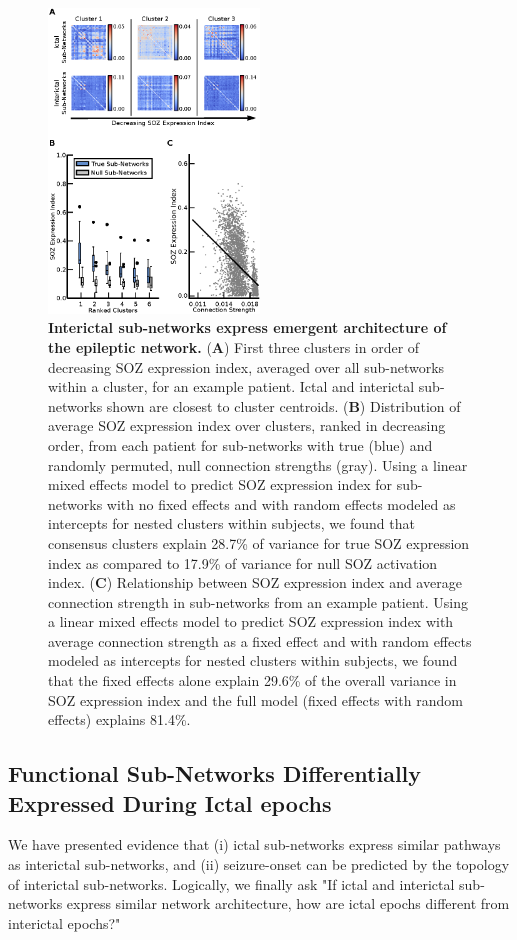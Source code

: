 \begin{figure}[H]
    \centering
    \includegraphics[width=0.5\textwidth]{panel4.eps}
    \caption[Interictal sub-networks predict epileptic network architecture]{\textbf{Interictal sub-networks express emergent architecture of the epileptic network.} (\textbf{A}) First three clusters in order of decreasing SOZ expression index, averaged over all sub-networks within a cluster, for an example patient. Ictal and interictal sub-networks shown are closest to cluster centroids. (\textbf{B}) Distribution of average SOZ expression index over clusters, ranked in decreasing order, from each patient for sub-networks with true (blue) and randomly permuted, null connection strengths (gray). Using a linear mixed effects model to predict SOZ expression index for sub-networks with no fixed effects and with random effects modeled as intercepts for nested clusters within subjects, we found that consensus clusters explain 28.7\% of variance for true SOZ expression index as compared to 17.9\% of variance for null SOZ activation index. (\textbf{C}) Relationship between SOZ expression index and average connection strength in sub-networks from an example patient. Using a linear mixed effects model to predict SOZ expression index with average connection strength as a fixed effect and with random effects modeled as intercepts for nested clusters within subjects, we found that the fixed effects alone explain 29.6\% of the overall variance in SOZ expression index and the full model (fixed effects with random effects) explains 81.4\%. \label{ch4:fig4}}
\end{figure}


\subsection{Functional Sub-Networks Differentially Expressed During Ictal epochs}
We have presented evidence that (i) ictal sub-networks express similar pathways as interictal sub-networks, and (ii) seizure-onset can be predicted by the topology of interictal sub-networks. Logically, we finally ask "If ictal and interictal sub-networks express similar network architecture, how are ictal epochs different from interictal epochs?" 

